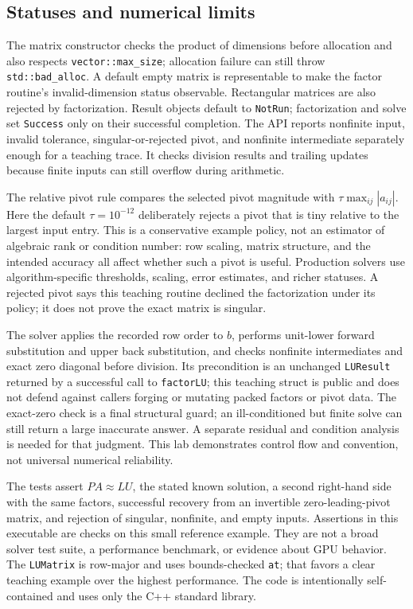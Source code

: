 \subsection{Statuses and numerical limits}\label{01-foundations-i-ch019-statuses-and-numerical-limits}

The matrix constructor checks the product of dimensions before allocation and also respects \texttt{vector::max\_size}; allocation failure can still throw \texttt{std::bad\_alloc}. A default empty matrix is representable to make the factor routine's invalid-dimension status observable. Rectangular matrices are also rejected by factorization. Result objects default to \texttt{NotRun}; factorization and solve set \texttt{Success} only on their successful completion. The API reports nonfinite input, invalid tolerance, singular-or-rejected pivot, and nonfinite intermediate separately enough for a teaching trace. It checks division results and trailing updates because finite inputs can still overflow during arithmetic.

The relative pivot rule compares the selected pivot magnitude with \(\tau\max_{ij}|a_{ij}|\). Here the default \(\tau=10^{-12}\) deliberately rejects a pivot that is tiny relative to the largest input entry. This is a conservative example policy, not an estimator of algebraic rank or condition number: row scaling, matrix structure, and the intended accuracy all affect whether such a pivot is useful. Production solvers use algorithm-specific thresholds, scaling, error estimates, and richer statuses. A rejected pivot says this teaching routine declined the factorization under its policy; it does not prove the exact matrix is singular.

The solver applies the recorded row order to \(b\), performs unit-lower forward substitution and upper back substitution, and checks nonfinite intermediates and exact zero diagonal before division. Its precondition is an unchanged \texttt{LUResult} returned by a successful call to \texttt{factorLU}; this teaching struct is public and does not defend against callers forging or mutating packed factors or pivot data. The exact-zero check is a final structural guard; an ill-conditioned but finite solve can still return a large inaccurate answer. A separate residual and condition analysis is needed for that judgment. This lab demonstrates control flow and convention, not universal numerical reliability.

The tests assert \(PA\approx LU\), the stated known solution, a second right-hand side with the same factors, successful recovery from an invertible zero-leading-pivot matrix, and rejection of singular, nonfinite, and empty inputs. Assertions in this executable are checks on this small reference example. They are not a broad solver test suite, a performance benchmark, or evidence about GPU behavior. The \texttt{LUMatrix} is row-major and uses bounds-checked \texttt{at}; that favors a clear teaching example over the highest performance. The code is intentionally self-contained and uses only the C++ standard library.

